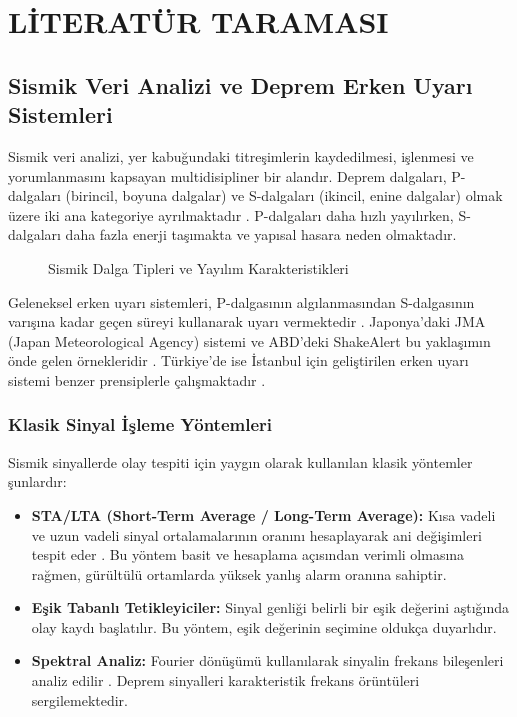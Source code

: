 \chapter{LİTERATÜR TARAMASI}

\section{Sismik Veri Analizi ve Deprem Erken Uyarı Sistemleri}

Sismik veri analizi, yer kabuğundaki titreşimlerin kaydedilmesi, işlenmesi ve yorumlanmasını kapsayan multidisipliner bir alandır. Deprem dalgaları, P-dalgaları (birincil, boyuna dalgalar) ve S-dalgaları (ikincil, enine dalgalar) olmak üzere iki ana kategoriye ayrılmaktadır \cite{stein2009introduction}. P-dalgaları daha hızlı yayılırken, S-dalgaları daha fazla enerji taşımakta ve yapısal hasara neden olmaktadır.

\begin{figure}[htbp]
    \centering
    \caption{Sismik Dalga Tipleri ve Yayılım Karakteristikleri}
    \label{fig:sismik_dalgalar}
\end{figure}

Geleneksel erken uyarı sistemleri, P-dalgasının algılanmasından S-dalgasının varışına kadar geçen süreyi kullanarak uyarı vermektedir \cite{allen2009real}. Japonya'daki JMA (Japan Meteorological Agency) sistemi ve ABD'deki ShakeAlert bu yaklaşımın önde gelen örnekleridir \cite{given2014technical}. Türkiye'de ise İstanbul için geliştirilen erken uyarı sistemi benzer prensiplerle çalışmaktadır \cite{erdik2003earthquake}.

\subsection{Klasik Sinyal İşleme Yöntemleri}

Sismik sinyallerde olay tespiti için yaygın olarak kullanılan klasik yöntemler şunlardır:

\begin{itemize}
    \item \textbf{STA/LTA (Short-Term Average / Long-Term Average):} Kısa vadeli ve uzun vadeli sinyal ortalamalarının oranını hesaplayarak ani değişimleri tespit eder \cite{allen1978automatic}. Bu yöntem basit ve hesaplama açısından verimli olmasına rağmen, gürültülü ortamlarda yüksek yanlış alarm oranına sahiptir.
    
    \item \textbf{Eşik Tabanlı Tetikleyiciler:} Sinyal genliği belirli bir eşik değerini aştığında olay kaydı başlatılır. Bu yöntem, eşik değerinin seçimine oldukça duyarlıdır.
    
    \item \textbf{Spektral Analiz:} Fourier dönüşümü kullanılarak sinyalin frekans bileşenleri analiz edilir \cite{oppenheim1999discrete}. Deprem sinyalleri karakteristik frekans örüntüleri sergilemektedir.
\end{itemize}

